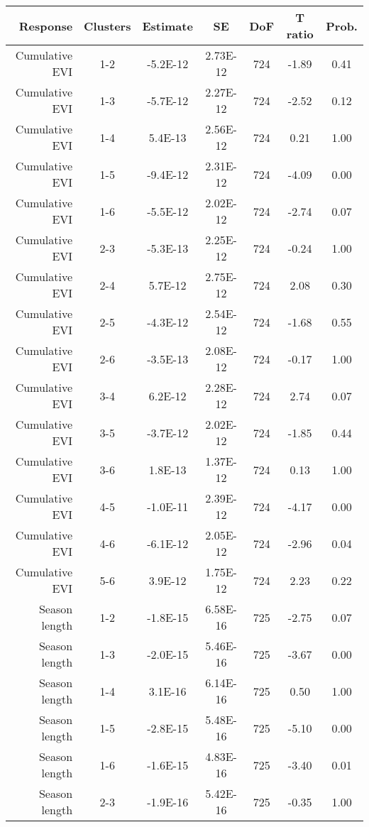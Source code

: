 \begin{table}[H]
\centering
\begin{tabular}{rcccccc}
  \hline
Response & Clusters & Estimate & SE & DoF & T ratio & Prob. \\ 
  \hline
Cumulative EVI & 1-2 & -5.2E-12 & 2.73E-12 & 724 & -1.89 & 0.41 \\ 
  Cumulative EVI & 1-3 & -5.7E-12 & 2.27E-12 & 724 & -2.52 & 0.12 \\ 
  Cumulative EVI & 1-4 & 5.4E-13 & 2.56E-12 & 724 & 0.21 & 1.00 \\ 
   \hline
Cumulative EVI & 1-5 & -9.4E-12 & 2.31E-12 & 724 & -4.09 & 0.00 \\ 
  Cumulative EVI & 1-6 & -5.5E-12 & 2.02E-12 & 724 & -2.74 & 0.07 \\ 
  Cumulative EVI & 2-3 & -5.3E-13 & 2.25E-12 & 724 & -0.24 & 1.00 \\ 
   \hline
Cumulative EVI & 2-4 & 5.7E-12 & 2.75E-12 & 724 & 2.08 & 0.30 \\ 
  Cumulative EVI & 2-5 & -4.3E-12 & 2.54E-12 & 724 & -1.68 & 0.55 \\ 
  Cumulative EVI & 2-6 & -3.5E-13 & 2.08E-12 & 724 & -0.17 & 1.00 \\ 
   \hline
Cumulative EVI & 3-4 & 6.2E-12 & 2.28E-12 & 724 & 2.74 & 0.07 \\ 
  Cumulative EVI & 3-5 & -3.7E-12 & 2.02E-12 & 724 & -1.85 & 0.44 \\ 
  Cumulative EVI & 3-6 & 1.8E-13 & 1.37E-12 & 724 & 0.13 & 1.00 \\ 
   \hline
Cumulative EVI & 4-5 & -1.0E-11 & 2.39E-12 & 724 & -4.17 & 0.00 \\ 
  Cumulative EVI & 4-6 & -6.1E-12 & 2.05E-12 & 724 & -2.96 & 0.04 \\ 
  Cumulative EVI & 5-6 & 3.9E-12 & 1.75E-12 & 724 & 2.23 & 0.22 \\ 
   \hline
Season length & 1-2 & -1.8E-15 & 6.58E-16 & 725 & -2.75 & 0.07 \\ 
  Season length & 1-3 & -2.0E-15 & 5.46E-16 & 725 & -3.67 & 0.00 \\ 
  Season length & 1-4 & 3.1E-16 & 6.14E-16 & 725 & 0.50 & 1.00 \\ 
  Season length & 1-5 & -2.8E-15 & 5.48E-16 & 725 & -5.10 & 0.00 \\ 
  Season length & 1-6 & -1.6E-15 & 4.83E-16 & 725 & -3.40 & 0.01 \\ 
  Season length & 2-3 & -1.9E-16 & 5.42E-16 & 725 & -0.35 & 1.00 \\ 

\end{tabular}
\end{table}
